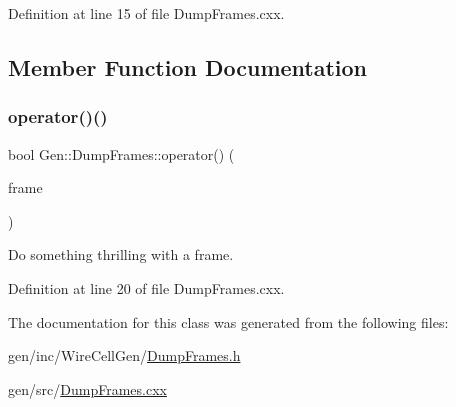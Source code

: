 Definition at line 15 of file Dump\+Frames.\+cxx.



\subsection{Member Function Documentation}
\mbox{\label{class_wire_cell_1_1_gen_1_1_dump_frames_acc0a2bf6204f818f0227881d1ca38439}} 
\subsubsection{\texorpdfstring{operator()()}{operator()()}}
{\footnotesize\ttfamily bool Gen\+::\+Dump\+Frames\+::operator() (\begin{DoxyParamCaption}\item[{const \hyperlink{class_wire_cell_1_1_i_data_aff870b3ae8333cf9265941eef62498bc}{I\+Frame\+::pointer} \&}]{frame }\end{DoxyParamCaption})\hspace{0.3cm}{\ttfamily [virtual]}}



Do something thrilling with a frame. 



Definition at line 20 of file Dump\+Frames.\+cxx.



The documentation for this class was generated from the following files\+:\begin{DoxyCompactItemize}
\item 
gen/inc/\+Wire\+Cell\+Gen/\hyperlink{_dump_frames_8h}{Dump\+Frames.\+h}\item 
gen/src/\hyperlink{_dump_frames_8cxx}{Dump\+Frames.\+cxx}\end{DoxyCompactItemize}

